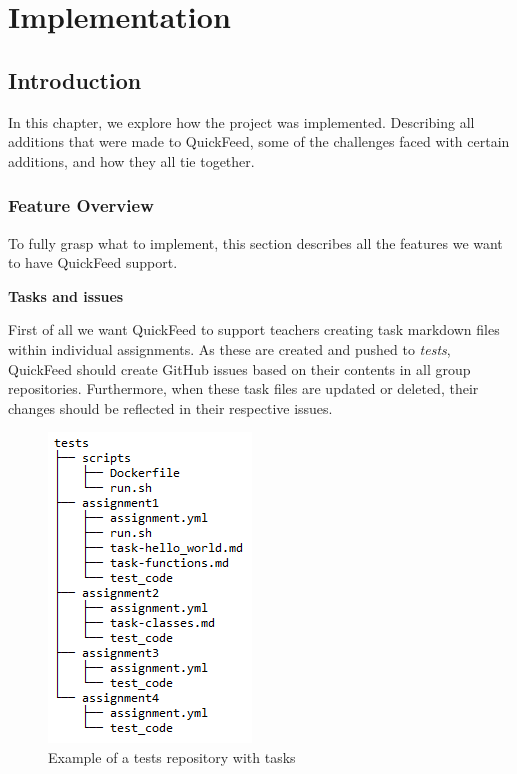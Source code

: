 
\chapter{Implementation}
\label{ch:implementation}

\section{Introduction}

In this chapter, we explore how the project was implemented.
Describing all additions that were made to QuickFeed, some of the challenges faced with certain additions, and how they all tie together.

\subsection{Feature Overview}

To fully grasp what to implement, this section describes all the features we want to have QuickFeed support.

\textbf{Tasks and issues}

First of all we want QuickFeed to support teachers creating task markdown files within individual assignments.
As these are created and pushed to \textit{tests}, QuickFeed should create GitHub issues based on their contents in all group repositories.
Furthermore, when these task files are updated or deleted, their changes should be reflected in their respective issues.

\begin{figure}[ht]
    \centering
    \includegraphics[scale=0.8]{photos/tests-repository-structure-tasks.PNG}
    \caption{Example of a tests repository with tasks}
    \label{fig:tests-repository-structure-tasks}
\end{figure}

